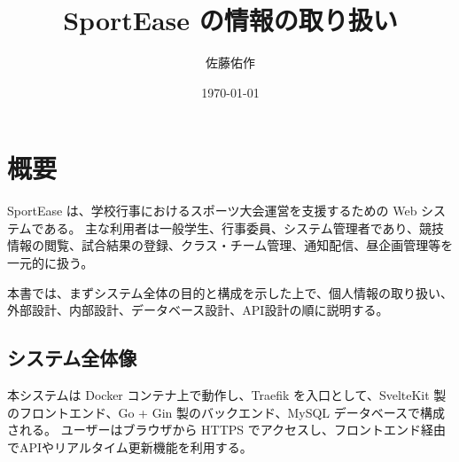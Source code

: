 \documentclass[paper=a4, fontsize=11pt]{jlreq}
\title{SportEase の情報の取り扱い}
\author{佐藤佑作} %
\date{\today}
\begin{document}
\maketitle

\section{概要}

SportEase は、学校行事におけるスポーツ大会運営を支援するための Web システムである。
主な利用者は一般学生、行事委員、システム管理者であり、競技情報の閲覧、試合結果の登録、クラス・チーム管理、通知配信、昼企画管理等を一元的に扱う。

本書では、まずシステム全体の目的と構成を示した上で、個人情報の取り扱い、外部設計、内部設計、データベース設計、API設計の順に説明する。

\subsection{システム全体像}
本システムは Docker コンテナ上で動作し、Traefik を入口として、SvelteKit 製のフロントエンド、Go + Gin 製のバックエンド、MySQL データベースで構成される。
ユーザーはブラウザから HTTPS でアクセスし、フロントエンド経由でAPIやリアルタイム更新機能を利用する。
\end{document}
